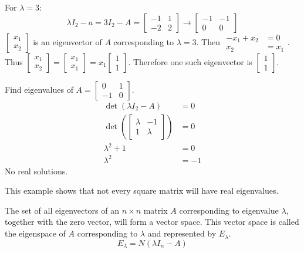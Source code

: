 \documentclass[12pt]{article}
\begin{document}
\begin{example}
For $\lambda = 3$: $$\lambda I_2 - a = 3I_2 - A = \begin{bmatrix} -1 & 1 \\ -2 & 2 \end{bmatrix} \rightarrow \begin{bmatrix} -1 & -1 \\ 0 & 0 \end{bmatrix} $$ 
$\begin{bmatrix} x_1 \\ x_2 \end{bmatrix} $ is an eigenvector of $A$ corresponding to $\lambda = 3$. Then $\begin{aligned} -x_1 + x_2 &= 0 \\ x_2 &= x_1 \end{aligned}$.
Thus $\begin{bmatrix} x_1 \\ x_2 \end{bmatrix} = \begin{bmatrix} x_1 \\ x_1 \end{bmatrix} = x_1\begin{bmatrix} 1 \\ 1 \end{bmatrix}$. Therefore one such eigenvector is $\begin{bmatrix} 1 \\ 1 \end{bmatrix}$. \end{example} 
\begin{example} Find eigenvalues of $A = \begin{bmatrix} 0 & 1 \\ -1 & 0 \end{bmatrix}$. $$\begin{aligned} \det(\lambda I_2 - A) &= 0 \\ \det(\begin{bmatrix} \lambda & -1 \\ 1 & \lambda \end{bmatrix}) &= 0 \\ \lambda^2 + 1 &= 0 \\ \lambda^2 &= -1 \end{aligned} $$ No real solutions. \end{example} 
This example shows that not every square matrix will have real eigenvalues. \newline
\begin{definition} The set of all eigenvectors of an $n \times n$ matrix $A$ corresponding to eigenvalue $\lambda$, together with the zero vector, will form a vector space. This vector space is called the eigenspace of $A$ corresponding to $\lambda$ and represented by $E_\lambda$. $$E_\lambda = N(\lambda I_n - A) $$ \end{definition} 
\end{document}
